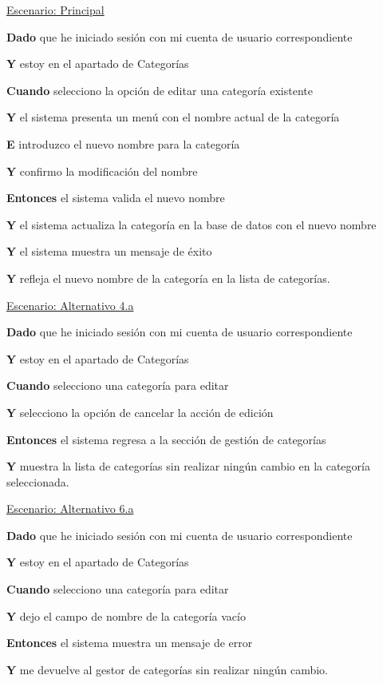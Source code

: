 \underline{Escenario: Principal}\par
\vspace{0.15cm}

\textbf{Dado} que he iniciado sesión con mi cuenta de usuario correspondiente\par
\textbf{Y} estoy en el apartado de Categorías\par
\textbf{Cuando} selecciono la opción de editar una categoría existente\par
\textbf{Y} el sistema presenta un menú con el nombre actual de la categoría\par
\textbf{E} introduzco el nuevo nombre para la categoría\par
\textbf{Y} confirmo la modificación del nombre\par
\textbf{Entonces} el sistema valida el nuevo nombre\par
\textbf{Y} el sistema actualiza la categoría en la base de datos con el nuevo nombre\par
\textbf{Y} el sistema muestra un mensaje de éxito\par
\textbf{Y} refleja el nuevo nombre de la categoría en la lista de categorías.\par


\vspace{0.20cm}


\underline{Escenario: Alternativo 4.a}\par
\vspace{0.15cm}

\textbf{Dado} que he iniciado sesión con mi cuenta de usuario correspondiente\par
\textbf{Y} estoy en el apartado de Categorías\par
\textbf{Cuando} selecciono una categoría para editar\par
\textbf{Y} selecciono la opción de cancelar la acción de edición\par
\textbf{Entonces} el sistema regresa a la sección de gestión de categorías\par
\textbf{Y} muestra la lista de categorías sin realizar ningún cambio en la categoría seleccionada.\par

\underline{Escenario: Alternativo 6.a}\par
\vspace{0.15cm}

\textbf{Dado} que he iniciado sesión con mi cuenta de usuario correspondiente\par
\textbf{Y} estoy en el apartado de Categorías\par
\textbf{Cuando} selecciono una categoría para editar\par
\textbf{Y} dejo el campo de nombre de la categoría vacío\par
\textbf{Entonces} el sistema muestra un mensaje de error\par
\textbf{Y} me devuelve al gestor de categorías sin realizar ningún cambio.\par

